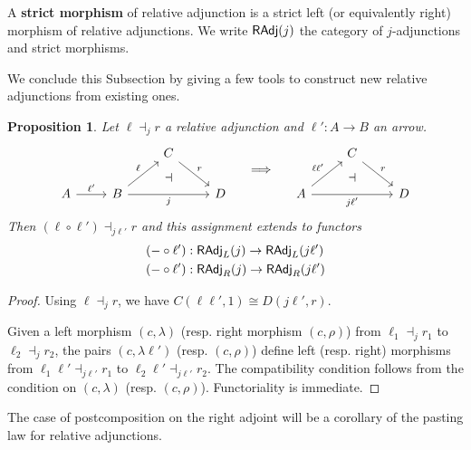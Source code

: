 \documentclass[10pt,a4paper]{article}
\newcommand{\cat}[1]{\textcat{#1}}
\newcommand{\textcat}[1]{{\normalfont\textsf{#1}}}
\newcommand{\simeqq}{\cong}
\theoremstyle{plain}
\newtheorem{proposition}[theorem]{Proposition}
\theoremstyle{definition}
\theoremstyle{remark}
\begin{document}
\begin{definition}
    A \textbf{strict morphism} of relative adjunction is a strict left (or equivalently right) morphism of relative adjunctions. We write $\cat{RAdj}(j)$ the category of $j$-adjunctions and strict morphisms.
\end{definition}

We conclude this Subsection by giving a few tools to construct new relative adjunctions from existing ones.

\begin{proposition}
    \label{prop:radj_precomp}
    Let $\ell\dashv_jr$ a relative adjunction and $\ell' : A\to B$ an arrow.
    \[\begin{tikzcd}
        &&C\ar[dr, "r"]&\\
        A \ar[r, "\ell'"] & B \ar[ur, "\ell"] \ar[rr, "j"'] &{}& D
        \ar[from=1-3, to=2-3, phantom, "\dashv"{anchor=center}]
    \end{tikzcd}
    \hspace{1em}
    \implies
    \hspace{1em}
    \begin{tikzcd}
        &C\ar[dr, "r"]&\\
        A \ar[ur, "\ell\ell'"] \ar[rr, "j\ell'"'] &{}& D
        \ar[from=1-2, to=2-2, phantom, "\dashv"{anchor=center}]
    \end{tikzcd}\]
    Then $(\ell\circ\ell')\dashv_{j\ell'}r$ and this assignment extends to functors
    \begin{align*}
        (-\circ\ell') &: \cat{RAdj}_L(j) \to \cat{RAdj}_L(j\ell')\\
        (-\circ\ell') &: \cat{RAdj}_R(j) \to \cat{RAdj}_R(j\ell')
    \end{align*}
\end{proposition}

\begin{proof}
    Using $\ell\dashv_j r$, we have $C(\ell\ell', 1) \simeqq D(j\ell', r)$.

    Given a left morphism $(c, \lambda)$ (resp. right morphism $(c, \rho)$) from $\ell_1\dashv_jr_1$ to $\ell_2\dashv_jr_2$, the pairs $(c, \lambda\ell')$ (resp. $(c, \rho)$) define left (resp. right) morphisms from $\ell_1\ell'\dashv_{j\ell'}r_1$ to $\ell_2\ell'\dashv_{j\ell'}r_2$. The compatibility condition follows from the condition on $(c, \lambda)$ (resp. $(c, \rho)$). Functoriality is immediate.
\end{proof}

The case of postcomposition on the right adjoint will be a corollary of the pasting law for relative adjunctions.
\end{document}

